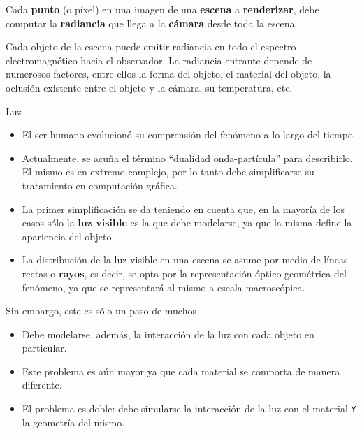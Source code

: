 \documentclass[spanish]{beamer}
\begin{document}
\begin{frame}[Escena]
Cada \textbf{punto} (o píxel) en una imagen de una \textbf{escena} a \textbf{renderizar}, debe computar la \textbf{radiancia} que llega a la \textbf{cámara} desde toda la escena.

Cada objeto de la escena puede emitir radiancia en todo el espectro electromagnético hacia el observador. La radiancia entrante depende de numerosos factores, entre ellos la forma del objeto, el material del objeto, la oclusión existente entre el objeto y la cámara, su temperatura, etc.
\end{frame}



\begin{frame}[Luz]
\begin{block}{Luz}
\begin{itemize}
\item El ser humano evolucionó su comprensión del fenómeno a lo largo del tiempo.
\item Actualmente, se acuña el término ``dualidad onda-partícula'' para describirlo. El mismo es en extremo complejo, por lo tanto debe simplificarse su tratamiento en computación gráfica.
\item La primer simplificación se da teniendo en cuenta que, en la mayoría de los casos sólo la \textbf{luz visible} es la que debe modelarse, ya que la misma define la apariencia del objeto.
\item La distribución de la luz visible en una escena se asume por medio de líneas rectas o \textbf{rayos}, es decir, se opta por la representación óptico geométrica del fenómeno, ya que se representará al mismo a escala macroscópica.
\end{itemize}
\end{block}
\end{frame}

\begin{frame}{}

\centering

\begin{block}{Sin embargo, este es sólo un paso de muchos}
\begin{itemize}
\item Debe modelarse, además, la interacción de la luz con cada objeto en particular.
\item Este problema es aún mayor ya que cada material se comporta de manera diferente.
\item El problema es doble: debe simularse la interacción de la luz con el material \texttt{Y} la geometría del mismo.
\end{itemize}
\end{block}

\end{frame}
\end{document}
